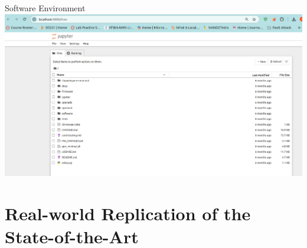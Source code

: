 \documentclass{beamer}
\newenvironment{tres important}[2][]{
	\setkeys{EmphEqEnv}{#2}
	\setkeys{EmphEqOpt}{box={\setlength{\fboxsep}{10pt}\fcolorbox{myNewColorA}{white}},#1}
	\EmphEqMainEnv}
{\endEmphEqMainEnv}
\begin{document}
\begin{frame}{Software Environment}
  \centering
  \includegraphics[width=0.8\linewidth]{images/softwareenv.png}
  
\end{frame}


\section{Real-world Replication of the State-of-the-Art}
\end{document}
